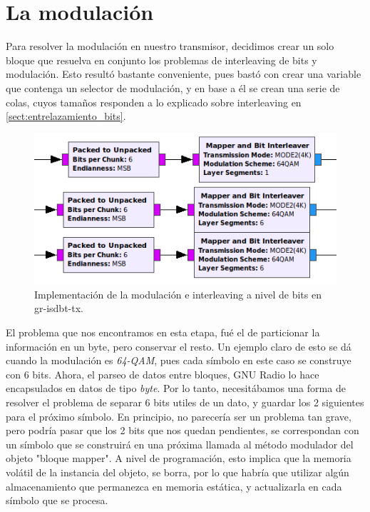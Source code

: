 \section{La modulación}

Para resolver la modulación en nuestro transmisor, decidimos crear un solo bloque que resuelva en conjunto los problemas de interleaving de bits y modulación. Esto resultó bastante conveniente, pues bastó con crear una variable que contenga un selector de modulación, y en base a él se crean una serie de colas, cuyos tamaños responden a lo explicado sobre interleaving en \ref{sect:entrelazamiento_bits}.

\begin{figure}[h!]
	\centering
	\includegraphics[scale=0.5]{figuras/cap05/modulacion}
	\caption{\label{f:modulacion} Implementación de la modulación e interleaving a nivel de bits en gr-isdbt-tx.}
\end{figure}


El problema que nos encontramos en esta etapa, fué el de particionar la información en un byte, pero conservar el resto. Un ejemplo claro de esto se dá cuando la modulación es \textit{64-QAM}, pues cada símbolo en este caso se construye con 6 bits. Ahora, el parseo de datos entre bloques, GNU Radio lo hace encapsulados en datos de tipo \textit{byte}. Por lo tanto, necesitábamos una forma de resolver el problema de separar 6 bits utiles de un dato, y guardar los 2 siguientes para el próximo símbolo. En principio, no parecería ser un problema tan grave, pero podría pasar que los 2 bits que nos quedan pendientes, se correspondan con un símbolo que se construirá en una próxima llamada al método modulador del objeto "bloque mapper". A nivel de programación, esto implica que la memoria volátil de la instancia del objeto, se borra, por lo que habría que utilizar algún almacenamiento que permanezca en memoria estática, y actualizarla en cada símbolo que se procesa.

